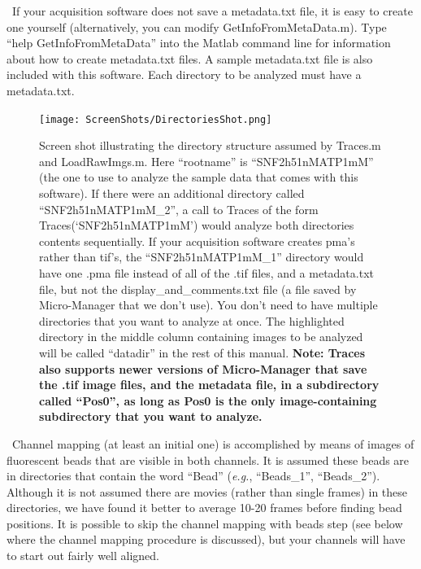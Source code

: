 \documentclass[11pt]{article}
\begin{document}
\noindent \textbullet~If your acquisition software does not save a metadata.txt file, it is easy to create one yourself (alternatively, you can modify GetInfoFromMetaData.m). Type ``help GetInfoFromMetaData'' into the Matlab command line for information about how to create metadata.txt files.  A sample metadata.txt file is also included with this software.  Each directory to be analyzed must have a metadata.txt.\\ 


\begin{figure}[!t]
\begin{center}
\texttt{[image: ScreenShots/DirectoriesShot.png]}
\caption{Screen shot illustrating the directory structure assumed by Traces.m and LoadRawImgs.m.  Here ``rootname'' is ``SNF2h51nMATP1mM''  (the one to use to analyze the sample data that comes with this software). If there were an additional directory called ``SNF2h51nMATP1mM\_2'', a call to Traces of the form Traces(`SNF2h51nMATP1mM') would analyze both directories contents sequentially.  If your acquisition software creates pma's rather than tif's, the ``SNF2h51nMATP1mM\_1'' directory would have one .pma file instead of all of the .tif files, and a metadata.txt file, but not the display\_and\_comments.txt file (a file saved by Micro-Manager that we don't use).  You don't need to have multiple directories that you want to analyze at once. The highlighted directory in the middle column containing images to be analyzed will be called ``datadir'' in the rest of this manual. {\bf Note: Traces also supports newer versions of Micro-Manager that save the .tif image files, and the metadata file, in a subdirectory called ``Pos0'', as long as Pos0 is the only image-containing subdirectory that you want to analyze.}}
\label{fig:DirectoryStructure}
\end{center}
\end{figure}

\noindent \textbullet~Channel mapping (at least an initial one) is accomplished by means of images of fluorescent beads that are visible in both channels. It is assumed these beads are in directories that contain the word ``Bead'' ({\it e.g.}, ``Beads\_1'', ``Beads\_2''). Although it is not assumed there are movies (rather than single frames) in these directories, we have found it better to average 10-20 frames before finding bead positions.  It is possible to skip the channel mapping with beads step (see below where the channel mapping procedure is discussed), but your channels will have to start out fairly well aligned.\\
\end{document}
